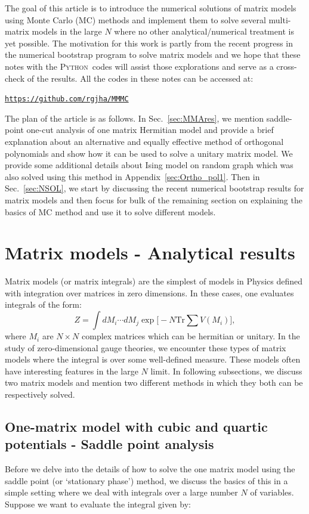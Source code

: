 \documentclass[11pt]{article}
\newcommand{\PY}{\textsc{Python}}
\begin{document}
The goal of this article is to introduce the numerical solutions of matrix models using Monte Carlo (MC) methods and implement them to solve several multi-matrix 
models in the large $N$ where no other analytical/numerical treatment is yet possible. The motivation for this work is partly from the recent progress in the numerical bootstrap program to solve matrix models and we hope that these notes with the \PY~codes will assist those explorations and serve as a cross-check of the results. All the codes in these notes can be accessed at:  
\begin{center} \texttt{\href{https://github.com/rgjha/MMMC}{https://github.com/rgjha/MMMC}} \end{center}
The plan of the article is as follows. In Sec.~\ref{sec:MMAres}, we mention saddle-point one-cut analysis of one matrix Hermitian model and provide a brief explanation about an alternative and equally effective
method of orthogonal polynomials and show how it can be used to 
solve a unitary matrix model. We provide some additional details about Ising model on random graph 
which was also solved using this method in Appendix~\ref{sec:Ortho_pol1}. 
Then in Sec.~\ref{sec:NSOL}, we start by discussing the recent 
numerical bootstrap results for matrix models and then focus for bulk of the 
remaining section on explaining the basics of MC method and use it to solve different models. 


\section{\label{sec:MMAres}Matrix models - Analytical results} 
Matrix models (or matrix integrals) are the simplest of models in Physics 
defined with integration over matrices in zero dimensions. 
In these cases, one evaluates integrals of the form:
\begin{equation}
Z = \int dM_{i} \cdots dM_{j} \exp\Bigg[-N \mathrm{Tr} \sum V(M_{i})\Bigg] ,
\end{equation}
where $M_{i}$ are $N \times N$ complex matrices which can be hermitian or unitary.  
In the study of zero-dimensional gauge theories, we encounter these types of matrix models 
where the integral is over some well-defined measure. These models often have interesting features in the 
large $N$ limit. In following subsections, we discuss two matrix models and mention two different methods in which they both can be respectively solved.

\subsection{One-matrix model with cubic and quartic potentials - Saddle point analysis}
Before we delve into the details of how to solve the one matrix model using the 
saddle point (or `stationary phase') method, we discuss the basics of this in a simple setting where we deal with integrals over a large number $N$ of variables. Suppose we want to evaluate the integral given by:
\end{document}
